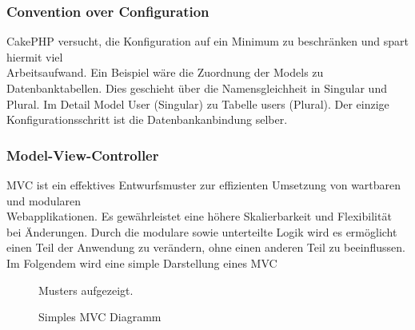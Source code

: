 \subsubsection{Convention over Configuration}
\label{sec:CoC}
CakePHP versucht, die Konfiguration auf ein Minimum zu beschränken und
spart hiermit viel \\ Arbeitsaufwand. Ein Beispiel wäre die Zuordnung der Models
zu Datenbanktabellen. Dies geschieht über die Namensgleichheit in Singular und Plural. 
Im Detail Model User (Singular) zu Tabelle users (Plural). Der einzige
Konfigurationsschritt ist die Datenbankanbindung selber.


\subsubsection{Model-View-Controller}
\label{sec:MVC} 
\ac{MVC} ist ein effektives Entwurfsmuster zur effizienten Umsetzung von 
wartbaren und modularen \\ Webapplikationen. Es gewährleistet eine höhere
Skalierbarkeit und Flexibilität bei Änderungen. Durch die modulare sowie
unterteilte Logik wird es ermöglicht einen Teil der Anwendung zu
verändern, ohne einen anderen Teil zu beeinflussen. Im Folgendem wird eine
simple Darstellung eines \ac{MVC} \begin{figure}[htb] Musters aufgezeigt.
\label{MVC-Diagramm}
\caption{Simples MVC Diagramm}
\end{figure}

